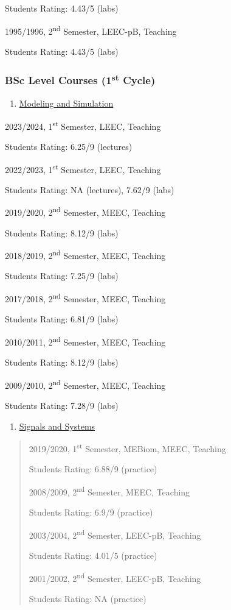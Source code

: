 \documentclass[
]{article}
\begin{document}
Students Rating: 4.43/5 (labs)

1995/1996, 2\textsuperscript{nd} Semester, LEEC-pB, Teaching

Students Rating: 4.43/5 (labs)

\subsubsection{\texorpdfstring{BSc Level Courses (1\textsuperscript{st}
Cycle)}{BSc Level Courses (1st Cycle)}}\label{bsc-level-courses-1st-cycle}

\begin{enumerate}
\def\labelenumi{\arabic{enumi}.}
\setcounter{enumi}{12}
\item
  \ul{Modeling and Simulation}
\end{enumerate}

2023/2024, 1\textsuperscript{st} Semester, LEEC, Teaching

Students Rating: 6.25/9 (lectures)

2022/2023, 1\textsuperscript{st} Semester, LEEC, Teaching

Students Rating: NA (lectures), 7.62/9 (labs)

2019/2020, 2\textsuperscript{nd} Semester, MEEC, Teaching

Students Rating: 8.12/9 (labs)

2018/2019, 2\textsuperscript{nd} Semester, MEEC, Teaching

Students Rating: 7.25/9 (labs)

2017/2018, 2\textsuperscript{nd} Semester, MEEC, Teaching

Students Rating: 6.81/9 (labs)

2010/2011, 2\textsuperscript{nd} Semester, MEEC, Teaching

Students Rating: 8.12/9 (labs)

2009/2010, 2\textsuperscript{nd} Semester, MEEC, Teaching

Students Rating: 7.28/9 (labs)

\begin{enumerate}
\def\labelenumi{\arabic{enumi}.}
\setcounter{enumi}{13}
\item
  \ul{Signals and Systems}
\end{enumerate}

\begin{quote}
2019/2020, 1\textsuperscript{st} Semester, MEBiom, MEEC, Teaching

Students Rating: 6.88/9 (practice)

2008/2009, 2\textsuperscript{nd} Semester, MEEC, Teaching

Students Rating: 6.9/9 (practice)

2003/2004, 2\textsuperscript{nd} Semester, LEEC-pB, Teaching

Students Rating: 4.01/5 (practice)

2001/2002, 2\textsuperscript{nd} Semester, LEEC-pB, Teaching

Students Rating: NA (practice)
\end{quote}
\end{document}
